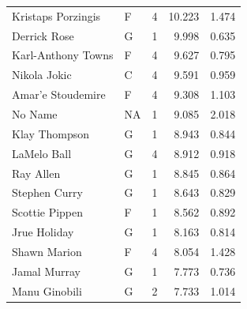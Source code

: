 \begin{table}[t]
\begin{tabular*}{\linewidth}{@{\extracolsep{\fill}}llcrr}
Kristaps Porzingis & F & 4 & 10.223 & 1.474 \\ 
Derrick Rose & G & 1 & 9.998 & 0.635 \\ 
Karl-Anthony Towns & F & 4 & 9.627 & 0.795 \\ 
Nikola Jokic & C & 4 & 9.591 & 0.959 \\ 
Amar'e Stoudemire & F & 4 & 9.308 & 1.103 \\ 
No Name & NA & 1 & 9.085 & 2.018 \\ 
Klay Thompson & G & 1 & 8.943 & 0.844 \\ 
LaMelo Ball & G & 4 & 8.912 & 0.918 \\ 
Ray Allen & G & 1 & 8.845 & 0.864 \\ 
Stephen Curry & G & 1 & 8.643 & 0.829 \\ 
Scottie Pippen & F & 1 & 8.562 & 0.892 \\ 
Jrue Holiday & G & 1 & 8.163 & 0.814 \\ 
Shawn Marion & F & 4 & 8.054 & 1.428 \\ 
Jamal Murray & G & 1 & 7.773 & 0.736 \\ 
Manu Ginobili & G & 2 & 7.733 & 1.014 \\ 
\bottomrule
\end{tabular*}
\end{table}

